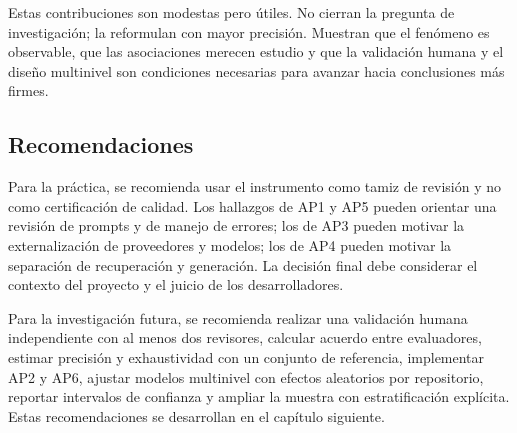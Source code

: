 Estas contribuciones son modestas pero útiles. No cierran la pregunta de investigación; la reformulan con mayor precisión. Muestran que el fenómeno es observable, que las asociaciones merecen estudio y que la validación humana y el diseño multinivel son condiciones necesarias para avanzar hacia conclusiones más firmes.

\subsection{Recomendaciones}

Para la práctica, se recomienda usar el instrumento como tamiz de revisión y no como certificación de calidad. Los hallazgos de AP1 y AP5 pueden orientar una revisión de prompts y de manejo de errores; los de AP3 pueden motivar la externalización de proveedores y modelos; los de AP4 pueden motivar la separación de recuperación y generación. La decisión final debe considerar el contexto del proyecto y el juicio de los desarrolladores.

Para la investigación futura, se recomienda realizar una validación humana independiente con al menos dos revisores, calcular acuerdo entre evaluadores, estimar precisión y exhaustividad con un conjunto de referencia, implementar AP2 y AP6, ajustar modelos multinivel con efectos aleatorios por repositorio, reportar intervalos de confianza y ampliar la muestra con estratificación explícita. Estas recomendaciones se desarrollan en el capítulo siguiente.
